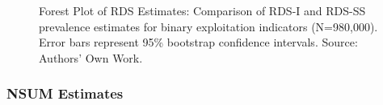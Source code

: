 \documentclass[
  12pt,
  letterpaper,
  DIV=11,
  numbers=noendperiod]{scrartcl}
\theoremstyle{plain}
\theoremstyle{definition}
\begin{document}
\begin{figure}[H]


\caption{\label{fig-rds-forest-plot}Forest Plot of RDS Estimates:
Comparison of RDS-I and RDS-SS prevalence estimates for binary
exploitation indicators (N=980,000). Error bars represent 95\% bootstrap
confidence intervals. Source: Authors' Own Work.}

\end{figure}%

\subsubsection{NSUM Estimates}\label{nsum-estimates}
\end{document}
